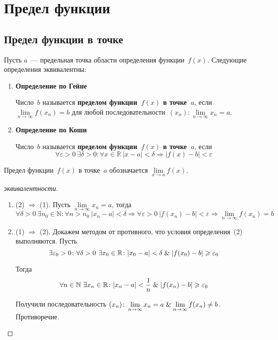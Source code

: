 \section{Предел функции}
\subsection{Предел функции в точке}
 

Пусть $a$~--- предельная точка области определения функции~$f(x)$.
Следующие определения эквивалентны:
\begin{enumerate}
	\item \textbf{Определение по Гейне}
	
	Число~$b$ называется \textbf{пределом функции~$f(x)$ в точке~$a$}, если $\lim\limits_{n \to \infty} f(x_n) = b$ для любой последовательности~$(x_n) \colon \lim\limits_{n \to \infty} x_n = a$.
	
	\item \textbf{Определение по Коши}
	
	Число~$b$ называется \textbf{пределом функции~$f(x)$ в точке~$a$}, если
	\begin{equation*}
	\forall \varepsilon > 0 \ \exists \delta > 0 \colon \forall x \in \mathbb R \ |x - a| < \delta \Rightarrow |f(x) - b| < \varepsilon
	\end{equation*}
\end{enumerate}

Предел функции~$f(x)$ в точке~$a$ обозначается $\lim\limits_{x \to a} f(x)$.
\begin{proof}[эквивалентности]
\begin{enumerate}
	\item (2) $\Rightarrow$ (1).
	Пусть $\lim\limits_{n \to \infty} x_n = a$, тогда
	\begin{equation*}
	\forall \delta > 0 \ \exists n_0 \in \mathbb N \colon \forall n > n_0 \ |x_n - a| < \delta \Rightarrow
	\forall \varepsilon > 0 \ |f(x_n) - b| < \varepsilon \Rightarrow
	\lim_{n \to \infty} f(x_n) = b
	\end{equation*}
	
	\item (1) $\Rightarrow$ (2).
	Докажем методом от противного, что условия определения~(2) выполняются.
	Пусть
	\begin{equation*}
	\exists \varepsilon_0 > 0 \colon \forall \delta > 0 \ \exists x_0 \in \mathbb R \colon |x_0 - a| < \delta \mathrel{\&} |f(x_0) - b| \geqslant \varepsilon_0
	\end{equation*}
	
	Тогда
	\begin{equation*}
	\forall n \in \mathbb N \ \exists x_n \in \mathbb R \colon |x_n - a| < \frac1n \mathrel{\&} |f(x_n) - b| \geqslant \varepsilon_0
	\end{equation*}
	
	Получили последовательность $(x_n) \colon \lim\limits_{n \to \infty} x_n = a \mathrel{\&} \lim\limits_{n \to \infty} f(x_n) \neq b$.
	Противоречие.
\end{enumerate}
\end{proof}

